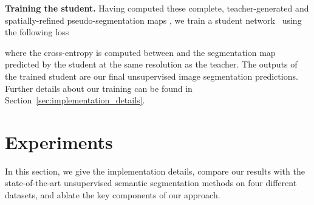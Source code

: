 \documentclass[runningheads]{llncs}
\newcommand{\paragraphcustom}[1]{\smallskip\noindent\textbf{#1}}
\begin{document}
\paragraphcustom{Training the student.} Having computed these complete, teacher-generated and spatially-refined pseudo-segmentation maps , we  train a 
student network~ using the following loss

where the cross-entropy is computed between 
 and 
the segmentation map~ predicted by the student at the same resolution as the teacher. The outputs of the trained student are our final unsupervised image segmentation predictions. Further details about our training can be found in Section~\ref{sec:implementation_details}. 
 
\section{Experiments}
\label{sec:experiments}
In this section, we give the implementation details, compare our results with the state-of-the-art unsupervised semantic segmentation methods on four different datasets, and ablate the key components of our approach.
\end{document}
